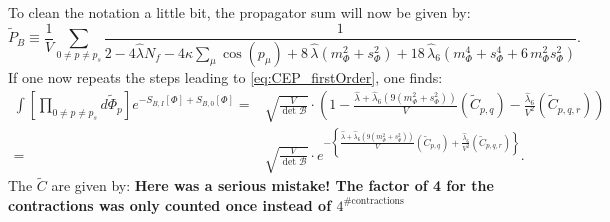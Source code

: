 To clean the notation a little bit, the propagator sum will now be given by:
\begin{equation}\label{eq:bosonicPropagatorSum_CEP_withDetAndLambda6}
 \tilde P_B \equiv \frac{1}{V}\sum\limits_{0\neq p\neq p_s} \frac{1}{2 - 4 \hat\lambda N_f - 4 \kappa \sum_{\mu} \cos(p_{\mu}) 
                   + 8\,  \hat\lambda \left( m_{\Phi}^2 + s_{\Phi}^2  \right) 
                   + 18\, \hat\lambda_6\left( m_{\Phi}^4 + s_{\Phi}^4 + 6\,  m_{\Phi}^2 s_{\Phi}^2 \right)}.
\end{equation}
If one now repeats the steps leading to \eqref{eq:CEP_firstOrder}, one finds:
\begin{align}\label{eq:CEP_firstOrder_withDetAndLambda6}
 \int \left[ \prod\limits_{0 \neq p \neq p_s}  d \tilde \Phi_p \right]   
                      e^{-S_{B,I}[\Phi] +  S_{B,0}[\Phi]} 
                      = & \sqrt{\frac{V}{\det \mathcal{B}}} \cdot 
                        \left(1 - \frac{\hat\lambda + \hat\lambda_6\left( 9\left( m_{\Phi}^2 + s_{\Phi}^2 \right) \right)}{V}\left( \tilde C_{p,q} \right) 
                        - \frac{\hat\lambda_6}{V^2} \left( \tilde C_{p,q,r} \right) \right)
          \nonumber \\
                      = & \sqrt{\frac{V}{\det \mathcal{B}}} 
                        \cdot e^{-\left\{ \frac{\hat\lambda + \hat\lambda_6\left( 9\left( m_{\Phi}^2 + s_{\Phi}^2 \right) \right)}{V}\left( \tilde C_{p,q} \right) 
                        + \frac{\hat\lambda_6}{V^2} \left( \tilde C_{p,q,r} \right) \right\} }.
\end{align}
The $\tilde C$ are given by:
\textbf{Here was a serious mistake! The factor of 4 for the contractions was only counted once instead of $4^{\#\text{contractions}}$}
